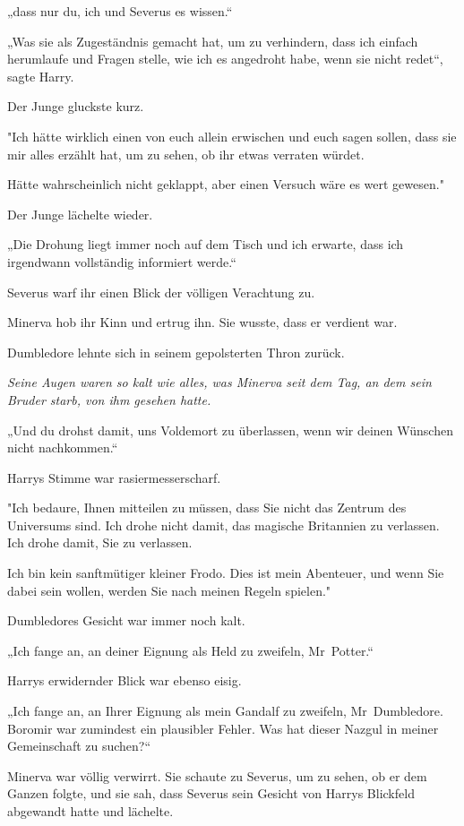 {„dass nur du, ich und Severus es wissen.“

„Was sie als Zugeständnis gemacht hat, um zu verhindern, dass ich einfach herumlaufe und Fragen stelle, wie ich es angedroht habe, wenn sie nicht redet“, sagte Harry.

Der Junge gluckste kurz.

"Ich hätte wirklich einen von euch allein erwischen und euch sagen sollen, dass sie mir alles erzählt hat, um zu sehen, ob ihr etwas verraten würdet.

Hätte wahrscheinlich nicht geklappt, aber einen Versuch wäre es wert gewesen."

Der Junge lächelte wieder.

„Die Drohung liegt immer noch auf dem Tisch und ich erwarte, dass ich irgendwann vollständig informiert werde.“

Severus warf ihr einen Blick der völligen Verachtung zu.

Minerva hob ihr Kinn und ertrug ihn. Sie wusste, dass er verdient war.

Dumbledore lehnte sich in seinem gepolsterten Thron zurück.

\emph{Seine Augen waren so kalt wie alles, was Minerva seit dem Tag, an dem sein Bruder starb, von ihm gesehen hatte.}

„Und du drohst damit, uns Voldemort zu überlassen, wenn wir deinen Wünschen nicht nachkommen.“

Harrys Stimme war rasiermesserscharf.

"Ich bedaure, Ihnen mitteilen zu müssen, dass Sie nicht das Zentrum des Universums sind. Ich drohe nicht damit, das magische Britannien zu verlassen. Ich drohe damit, Sie zu verlassen.

Ich bin kein sanftmütiger kleiner Frodo. Dies ist mein Abenteuer, und wenn Sie dabei sein wollen, werden Sie nach meinen Regeln spielen."

Dumbledores Gesicht war immer noch kalt.

„Ich fange an, an deiner Eignung als Held zu zweifeln, Mr~Potter.“

Harrys erwidernder Blick war ebenso eisig.

„Ich fange an, an Ihrer Eignung als mein Gandalf zu zweifeln, Mr~Dumbledore. Boromir war zumindest ein plausibler Fehler. Was hat dieser Nazgul in meiner Gemeinschaft zu suchen?“

Minerva war völlig verwirrt. Sie schaute zu Severus, um zu sehen, ob er dem Ganzen folgte, und sie sah, dass Severus sein Gesicht von Harrys Blickfeld abgewandt hatte und lächelte.

}
